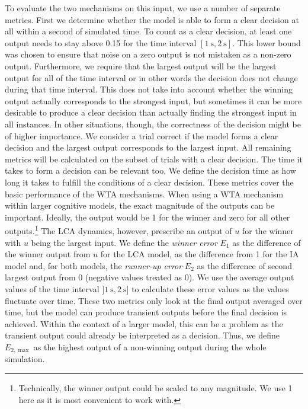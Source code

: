 \documentclass[10pt,letterpaper]{article}
\begin{document}
To evaluate the two mechanisms on this input, we use a number of separate metrics.
First we determine whether the model is able to form a clear decision at all within a second of simulated time.
To count as a clear decision, at least one output needs to stay above 0.15 for the time interval
$[\SI{1}{\second}, \SI{2}{\second}]$. %
This lower bound was chosen to ensure that noise on a zero output is not mistaken as a non-zero output.
Furthermore, we require that the largest output will be the largest output for all of the time interval or in other words the decision does not change during that time interval.
This does not take into account whether the winning output actually corresponds to the strongest input, but sometimes it can be more desirable to produce a clear decision than actually finding the strongest input in all instances.
In other situations, though, the correctness of the decision might be of higher importance.
We consider a trial correct if the model forms a clear decision and the largest output corresponds to the largest input.
All remaining metrics will be calculated on the subset of trials with a clear decision.
The time it takes to form a decision can be relevant too.
We define the decision time as how long it takes to fulfill the conditions of a clear decision.
These metrics cover the basic performance of the WTA mechanisms.
When using a WTA mechanism within larger cognitive models, the exact magnitude of the outputs can be important.
Ideally, the output would be 1 for the winner and zero for all other outputs.\footnote{Technically, the winner output could be scaled     to any magnitude.
We use 1 here as it is most convenient to work with.} The LCA dynamics, however, prescribe an output of $u$ for the winner with $u$ being the largest input.
We define the \emph{winner error} $E_1$ as the difference of the winner output from $u$ for the LCA model, as the difference from 1 for the IA model and, for both models, the \emph{runner-up error} $E_2$ as the difference of second largest output from 0 (negative values treated as 0).
We use the average output values of the time   interval
 $]\SI{1}{\second}, \SI{2}{\second}]$ %
to calculate these error values as the values fluctuate over time.
These two metrics only look at the final output averaged over time, but the model can produce transient outputs before the final decision is achieved.
Within the context of a larger model, this can be a problem as the transient output could already be interpreted as a decision.
Thus, we define $E_{2,\max}$ 
as the highest output of a non-winning output during the whole simulation.
\end{document}
